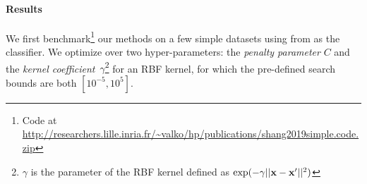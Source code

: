 \paragraph{Results} We first benchmark\footnote{Code at \url{http://researchers.lille.inria.fr/~valko/hp/publications/shang2019simple.code.zip}} our methods on a few simple \UCI datasets using \SVM from \Scikit as the classifier. We  optimize over two hyper-parameters: the \emph{penalty parameter} $C$ and the \emph{kernel coefficient}~$\gamma$\footnote{$\gamma$ is the parameter of the RBF kernel defined as $\exp(-\gamma||{\bf x}-{\bf x}'||^2)$}
for an RBF kernel, for which the pre-defined search bounds are both $\left[10^{-5}, 10^{5} \right]$.


